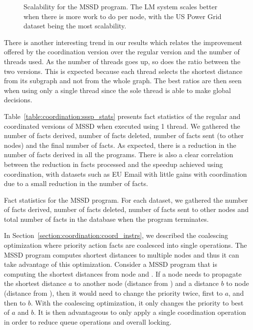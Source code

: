 \begin{figure}[]
        \caption{Scalability for the MSSD program. The LM system scales better
        when there is more work to do per node, with the US Power Grid dataset being the
        most scalability.}

        \label{fig:coordination:results_sssp}
\end{figure}

There is another interesting trend in our results which relates the improvement
offered by the coordination version over the regular version and the number of
threads used. As the number of threads goes up, so does the ratio between the
two versions. This is expected because each thread selects the shortest distance
from its subgraph and not from the whole graph. The best ratios are then seen
when using only a single thread since the sole thread is able to make global
decisions.

Table~\ref{table:coordination:sssp_stats} presents fact statistics of the
regular and coordinated versions of MSSD when executed using 1 thread. We
gathered the number of facts derived, number of facts deleted, number of facts
sent (to other nodes) and the final number of facts. As expected, there is a
reduction in the number of facts derived in all the programs. There is also a
clear correlation between the reduction in facts processed and the speedup
achieved using coordination, with datasets such as EU Email with little gains
with coordination due to a small reduction in the number of facts.

\begin{table}[ht]
   \begin{center}
      
   \end{center}
   \caption{Fact statistics for the MSSD program. For each dataset, we gathered
   the number of facts derived, number of facts deleted, number of facts sent to
other nodes and total number of facts in the database when the program
terminates.}
   \label{table:coordination:sssp_stats}
\end{table}

In Section~\ref{section:coordination:coord_instrs}, we described the coalescing
optimization where priority action facts are coalesced into single operations.
The MSSD program computes shortest distances to multiple nodes and thus it can
take advantage of this optimization. Consider a MSSD program that is computing
the shortest distances from node  and . If a node 
needs to propagate the shortest distance $a$ to another node  (distance
from ) and a distance $b$ to node  (distance from ),
then it would need to change the priority twice, first to $a$, and then to $b$.
With the coalescing optimization, it only changes the priority to best of $a$
and $b$.  It is then advantageous to only apply a single coordination operation
in order to reduce queue operations and overall locking.

